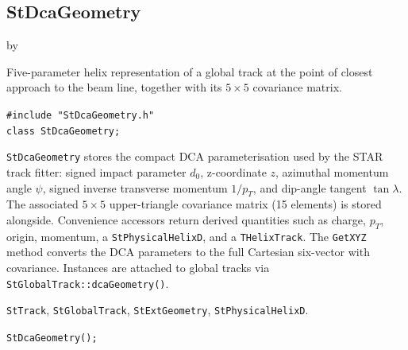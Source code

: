 \documentclass[twoside]{article}
\newcommand{\entrylabel}[1]{\mbox{\textbf{{#1}}}\hfil}%
\newenvironment{entry}
{\begin{list}{}%
    {\renewcommand{\makelabel}{\entrylabel}%
     \setlength{\labelwidth}{90pt}%
     \setlength{\leftmargin}{\labelwidth}
     \advance\leftmargin by \labelsep%
      }%
    }%
  {\end{list}}
\newcommand{\Entrylabel}[1]%
{\raisebox{0pt}[1ex][0pt]{\makebox[\labelwidth][l]%
    {\parbox[t]{\labelwidth}{\hspace{0pt}\textbf{{#1}}}}}}
\newenvironment{Entry}%
{\renewcommand{\entrylabel}{\Entrylabel}\begin{entry}}%
  {\end{entry}}
\begin{document}
\subsection{StDcaGeometry}
\label{sec:StDcaGeometry}
\begin{Entry}
\item[Summary]
    Five-parameter helix representation of a global track at the point of
    closest approach to the beam line, together with its $5\times5$ covariance
    matrix.

\item[Synopsis]
    \verb+#include "StDcaGeometry.h"+\\
    \verb+class StDcaGeometry;+\\

\item[Description]
    \texttt{StDcaGeometry} stores the compact DCA parameterisation used by the
    STAR track fitter: signed impact parameter $d_0$, z-coordinate $z$, azimuthal
    momentum angle $\psi$, signed inverse transverse momentum $1/p_T$, and dip-angle
    tangent $\tan\lambda$.  The associated $5\times5$ upper-triangle covariance
    matrix (15 elements) is stored alongside.  Convenience accessors return derived
    quantities such as charge, $p_T$, origin, momentum, a \texttt{StPhysicalHelixD},
    and a \texttt{THelixTrack}.  The \texttt{GetXYZ} method converts the DCA
    parameters to the full Cartesian six-vector with covariance.
    Instances are attached to global tracks via
    \texttt{StGlobalTrack::dcaGeometry()}.

\item[Related Classes]
    \texttt{StTrack}, \texttt{StGlobalTrack}, \texttt{StExtGeometry},
    \texttt{StPhysicalHelixD}.

\item[Public\\ Constructors]
    \verb+StDcaGeometry();+\\


\end{Entry}
\end{document}
